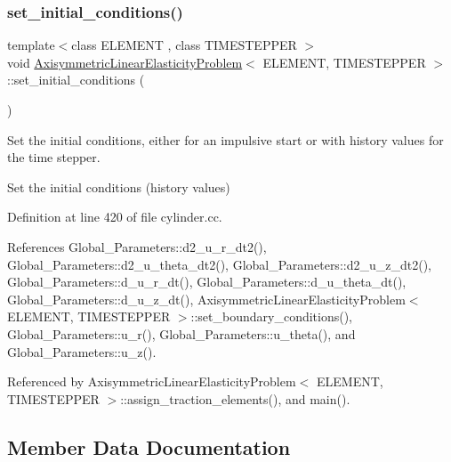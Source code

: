 \subsubsection{\texorpdfstring{set\+\_\+initial\+\_\+conditions()}{set\_initial\_conditions()}}
{\footnotesize\ttfamily template$<$class E\+L\+E\+M\+E\+NT , class T\+I\+M\+E\+S\+T\+E\+P\+P\+ER $>$ \\
void \hyperlink{classAxisymmetricLinearElasticityProblem}{Axisymmetric\+Linear\+Elasticity\+Problem}$<$ E\+L\+E\+M\+E\+NT, T\+I\+M\+E\+S\+T\+E\+P\+P\+ER $>$\+::set\+\_\+initial\+\_\+conditions (\begin{DoxyParamCaption}{ }\end{DoxyParamCaption})}



Set the initial conditions, either for an impulsive start or with history values for the time stepper. 

Set the initial conditions (history values) 

Definition at line 420 of file cylinder.\+cc.



References Global\+\_\+\+Parameters\+::d2\+\_\+u\+\_\+r\+\_\+dt2(), Global\+\_\+\+Parameters\+::d2\+\_\+u\+\_\+theta\+\_\+dt2(), Global\+\_\+\+Parameters\+::d2\+\_\+u\+\_\+z\+\_\+dt2(), Global\+\_\+\+Parameters\+::d\+\_\+u\+\_\+r\+\_\+dt(), Global\+\_\+\+Parameters\+::d\+\_\+u\+\_\+theta\+\_\+dt(), Global\+\_\+\+Parameters\+::d\+\_\+u\+\_\+z\+\_\+dt(), Axisymmetric\+Linear\+Elasticity\+Problem$<$ E\+L\+E\+M\+E\+N\+T, T\+I\+M\+E\+S\+T\+E\+P\+P\+E\+R $>$\+::set\+\_\+boundary\+\_\+conditions(), Global\+\_\+\+Parameters\+::u\+\_\+r(), Global\+\_\+\+Parameters\+::u\+\_\+theta(), and Global\+\_\+\+Parameters\+::u\+\_\+z().



Referenced by Axisymmetric\+Linear\+Elasticity\+Problem$<$ E\+L\+E\+M\+E\+N\+T, T\+I\+M\+E\+S\+T\+E\+P\+P\+E\+R $>$\+::assign\+\_\+traction\+\_\+elements(), and main().



\subsection{Member Data Documentation}
\mbox{\label{classAxisymmetricLinearElasticityProblem_a49f2e786217cf28ebed1d828a4b06147}} 
